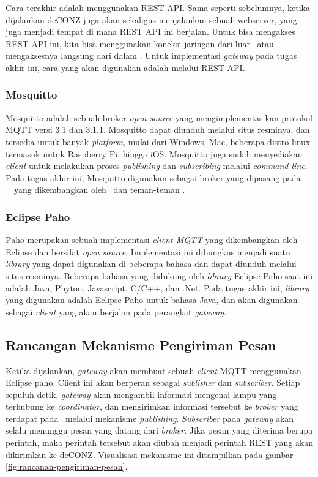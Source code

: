 Cara terakhir adalah menggunakan REST API. Sama seperti sebelumnya, ketika dijalankan deCONZ juga akan sekaligus menjalankan sebuah webserver, yang juga menjadi tempat di mana REST API ini berjalan. Untuk bisa mengakses REST API ini, kita bisa menggunakan koneksi jaringan dari luar \rasp~atau mengaksesnya langsung dari dalam \rasp. Untuk implementasi \textit{gateway} pada tugas akhir ini, cara yang akan digunakan adalah melalui REST API.

\subsubsection{Mosquitto}
Mosquitto adalah sebuah broker \textit{open source} yang mengimplementasikan protokol MQTT versi 3.1 dan 3.1.1. Mosquitto dapat diunduh melalui situs resminya, dan tersedia untuk banyak \textit{platform}, mulai dari Windows, Mac, beberapa distro linux termasuk untuk Raspberry Pi, hingga iOS. Mosquitto juga sudah menyediakan \textit{client} untuk melakukan proses \textit{publishing} dan \textit{subscribing} melalui \textit{command line}. Pada tugas akhir ini, Mosquitto digunakan sebagai broker yang dipasang pada \plat~\iot~yang dikembangkan oleh \saya~dan teman-teman \saya.

\subsubsection{Eclipse Paho}
Paho merupakan sebuah implementasi \textit{client MQTT} yang dikembangkan oleh Eclipse dan bersifat \textit{open source}. Implementasi ini dibungkus menjadi suatu \textit{library} yang dapat digunakan di beberapa bahasa dan dapat diunduh melalui situs resminya. Beberapa bahasa yang didukung oleh \textit{library} Eclipse Paho saat ini adalah Java, Phyton, Javascript, C/C++, dan .Net. Pada tugas akhir ini, \textit{library} yang digunakan adalah Eclipse Paho untuk bahasa Java, dan akan digunakan sebagai \textit{client} yang akan berjalan pada perangkat \textit{gateway}.

\subsection{Rancangan Mekanisme Pengiriman Pesan}
Ketika dijalankan, \textit{gateway} akan membuat sebuah \textit{client} MQTT menggunakan Eclipse paho. Client ini akan berperan sebagai \textit{sublisher} dan \textit{subscriber}. Setiap sepuluh detik, \textit{gateway} akan mengambil informasi mengenai lampu yang terhubung ke \textit{coordinator}, dan mengirimkan informasi tersebut ke \textit{broker} yang terdapat pada \plat~melalui mekanisme \textit{publishing}. \textit{Subscriber} pada \textit{gateway} akan selalu menunggu pesan yang datang dari \textit{broker}. Jika pesan yang diterima berupa perintah, maka perintah tersebut akan diubah menjadi perintah REST yang akan dikirimkan ke deCONZ. Visualisasi mekanisme ini ditampilkan pada gambar \ref{fig:rancanan-pengiriman-pesan}.

